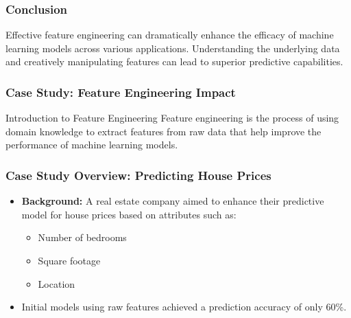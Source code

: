 \documentclass[aspectratio=169]{beamer}
\begin{document}
\begin{frame}
    \frametitle{Conclusion}
    Effective feature engineering can dramatically enhance the efficacy of machine learning models across various applications. Understanding the underlying data and creatively manipulating features can lead to superior predictive capabilities.
\end{frame}

\begin{frame}[fragile]
    \frametitle{Case Study: Feature Engineering Impact}
    \begin{block}{Introduction to Feature Engineering}
        Feature engineering is the process of using domain knowledge to extract features from raw data that help improve the performance of machine learning models.
    \end{block}
\end{frame}

\begin{frame}[fragile]
    \frametitle{Case Study Overview: Predicting House Prices}
    \begin{itemize}
        \item \textbf{Background:} A real estate company aimed to enhance their predictive model for house prices based on attributes such as:
        \begin{itemize}
            \item Number of bedrooms
            \item Square footage
            \item Location
        \end{itemize}
        \item Initial models using raw features achieved a prediction accuracy of only 60\%.
    \end{itemize}
\end{frame}
\end{document}
